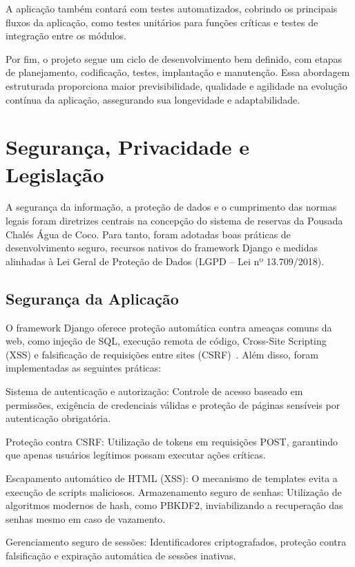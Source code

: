 \documentclass[
	12pt,				%
	openany,			%
	oneside,			%
	a4paper,			%
	english,			%
	french,				%
	spanish,			%
	brazil				%
	]{abntex2}
\begin{document}
A aplicação também contará com testes automatizados, cobrindo os principais fluxos da aplicação, como testes unitários para funções críticas e testes de integração entre os módulos.

Por fim, o projeto segue um ciclo de desenvolvimento bem definido, com etapas de planejamento, codificação, testes, implantação e manutenção. Essa abordagem estruturada proporciona maior previsibilidade, qualidade e agilidade na evolução contínua da aplicação, assegurando sua longevidade e adaptabilidade.

\section{Segurança, Privacidade e Legislação}

A segurança da informação, a proteção de dados e o cumprimento das normas legais foram diretrizes centrais na concepção do sistema de reservas da Pousada Chalés Água de Coco. Para tanto, foram adotadas boas práticas de desenvolvimento seguro, recursos nativos do framework Django e medidas alinhadas à Lei Geral de Proteção de Dados (LGPD – Lei nº 13.709/2018).

\subsection{Segurança da Aplicação}

O framework Django oferece proteção automática contra ameaças comuns da web, como injeção de SQL, execução remota de código, Cross-Site Scripting (XSS) e falsificação de requisições entre sites (CSRF)~\cite{django}. Além disso, foram implementadas as seguintes práticas:

Sistema de autenticação e autorização: Controle de acesso baseado em permissões, exigência de credenciais válidas e proteção de páginas sensíveis por autenticação obrigatória.

Proteção contra CSRF: Utilização de tokens em requisições POST, garantindo que apenas usuários legítimos possam executar ações críticas.

Escapamento automático de HTML (XSS): O mecanismo de templates evita a execução de scripts maliciosos.
Armazenamento seguro de senhas: Utilização de algoritmos modernos de hash, como PBKDF2, inviabilizando a recuperação das senhas mesmo em caso de vazamento.

Gerenciamento seguro de sessões: Identificadores criptografados, proteção contra falsificação e expiração automática de sessões inativas.
\end{document}
